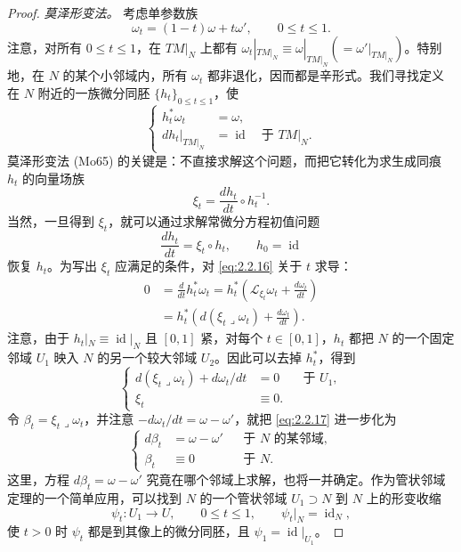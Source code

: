 \begin{proof}
\noindent\emph{莫泽形变法。}
考虑单参数族
\[
  \omega_t=(1-t)\omega+t\omega',\qquad 0\le t\le1.
\]
注意，对所有 $0\le t\le1$，在 $TM|_N$ 上都有
$\omega_t|_{TM|_N}\equiv\omega|_{TM|_N}(=\omega'|_{TM|_N})$。特别地，在 $N$ 的某个小邻域内，所有 $\omega_t$ 都非退化，因而都是辛形式。我们寻找定义在 $N$ 附近的一族微分同胚 $\{h_t\}_{0\le t\le1}$，使
\begin{equation}
 \left\{
 \begin{aligned}
  h_t^*\omega_t&=\omega,\\
  dh_t|_{TM|_N}&=\operatorname{id}\quad\text{于 }TM|_N.
 \end{aligned}
 \right.
 \label{eq:2.2.16}
\end{equation}
莫泽形变法 (Mo65) 的关键是：不直接求解这个问题，而把它转化为求生成同痕 $h_t$ 的向量场族
\[
  \xi_t=\frac{dh_t}{dt}\circ h_t^{-1}.
\]
当然，一旦得到 $\xi_t$，就可以通过求解常微分方程初值问题
\[
  \frac{dh_t}{dt}=\xi_t\circ h_t,
  \qquad h_0=\operatorname{id}
\]
恢复 $h_t$。为写出 $\xi_t$ 应满足的条件，对 \eqref{eq:2.2.16} 关于 $t$ 求导：
\begin{align*}
 0&=\frac d{dt}h_t^*\omega_t
   =h_t^*\left(\mathcal L_{\xi_t}\omega_t+\frac{d\omega_t}{dt}\right)\\
  &=h_t^*\left(d(\xi_t\mathbin{\lrcorner}\omega_t)+\frac{d\omega_t}{dt}\right).
\end{align*}
注意，由于 $h_t|_N\equiv\operatorname{id}|_N$ 且 $[0,1]$ 紧，对每个 $t\in[0,1]$，$h_t$ 都把 $N$ 的一个固定邻域 $U_1$ 映入 $N$ 的另一个较大邻域 $U_2$。因此可以去掉 $h_t^*$，得到
\begin{equation}
 \left\{
 \begin{aligned}
  d(\xi_t\mathbin{\lrcorner}\omega_t)+d\omega_t/dt&=0
    &&\text{于 }U_1,\\
  \xi_t&\equiv0.
 \end{aligned}
 \right.
 \label{eq:2.2.17}
\end{equation}
令 $\beta_t=\xi_t\mathbin{\lrcorner}\omega_t$，并注意 $-d\omega_t/dt=\omega-\omega'$，就把 \eqref{eq:2.2.17} 进一步化为
\begin{equation}
 \left\{
 \begin{aligned}
  d\beta_t&=\omega-\omega' &&\text{于 }N\text{ 的某邻域},\\
  \beta_t&\equiv0 &&\text{于 }N.
 \end{aligned}
 \right.
 \label{eq:2.2.18}
\end{equation}
这里，方程 $d\beta_t=\omega-\omega'$ 究竟在哪个邻域上求解，也将一并确定。作为管状邻域定理的一个简单应用，可以找到 $N$ 的一个管状邻域 $U_1\supset N$ 到 $N$ 上的形变收缩
\[
  \psi_t:U_1\longrightarrow U,
  \qquad 0\le t\le1,
  \qquad \psi_t|_N=\operatorname{id}_N,
\]
使 $t>0$ 时 $\psi_t$ 都是到其像上的微分同胚，且 $\psi_1=\operatorname{id}|_{U_1}$。


\end{proof}
